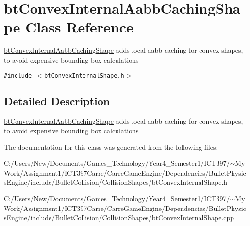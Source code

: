 \hypertarget{classbt_convex_internal_aabb_caching_shape}{
\section{btConvexInternalAabbCachingShape Class Reference}
\label{classbt_convex_internal_aabb_caching_shape}
}
\hyperlink{classbt_convex_internal_aabb_caching_shape}{btConvexInternalAabbCachingShape} adds local aabb caching for convex shapes, to avoid expensive bounding box calculations  


{\tt \#include $<$btConvexInternalShape.h$>$}



\subsection{Detailed Description}
\hyperlink{classbt_convex_internal_aabb_caching_shape}{btConvexInternalAabbCachingShape} adds local aabb caching for convex shapes, to avoid expensive bounding box calculations 

The documentation for this class was generated from the following files:\begin{CompactItemize}
\item 
C:/Users/New/Documents/Games\_\-Technology/Year4\_\-Semester1/ICT397/$\sim$My Work/Assignment1/ICT397Carre/CarreGameEngine/Dependencies/BulletPhysicsEngine/include/BulletCollision/CollisionShapes/btConvexInternalShape.h\item 
C:/Users/New/Documents/Games\_\-Technology/Year4\_\-Semester1/ICT397/$\sim$My Work/Assignment1/ICT397Carre/CarreGameEngine/Dependencies/BulletPhysicsEngine/include/BulletCollision/CollisionShapes/btConvexInternalShape.cpp\end{CompactItemize}
